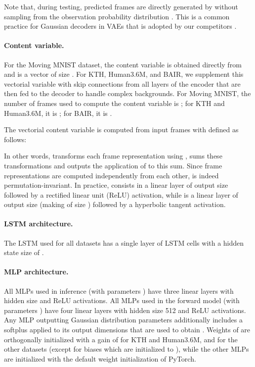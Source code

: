 \documentclass{article}
\begin{document}
Note that, during testing, predicted frames are directly generated by  without sampling from the observation probability distribution .
This is a common practice for Gaussian decoders in VAEs that is adopted by our competitors \citep{Lee2018, Denton2018, Minderer2019}.

\paragraph{Content variable.}
For the Moving MNIST dataset, the content variable  is obtained directly from  and is a vector of size .
For KTH, Human3.6M, and BAIR, we supplement this vectorial variable with skip connections from all layers of the encoder  that are then fed to the decoder  to handle complex backgrounds.
For Moving MNIST, the number of frames  used to compute the content variable is ; for KTH and Human3.6M, it is ; for BAIR, it is .

The vectorial content variable  is computed from  input frames  with  defined as follows:

In other words,  transforms each frame representation using , sums these transformations and outputs the application of  to this sum.
Since frame representations  are computed independently from each other,  is indeed permutation-invariant.
In practice,  consists in a linear layer of output size  followed by a rectified linear unit (ReLU) activation, while  is a linear layer of output size  (making  of size ) followed by a hyperbolic tangent activation.

\paragraph{LSTM architecture.}

The LSTM used for all datasets has a single layer of LSTM cells with a hidden state size of .

\paragraph{MLP architecture.}

All MLPs used in inference (with parameters ) have three linear layers with hidden size  and ReLU activations.
All MLPs used in the forward model (with parameters ) have four linear layers with hidden size 512 and ReLU activations.
Any MLP outputting Gaussian distribution parameters  additionally includes a softplus \citep{Dugas2001} applied to its output dimensions that are used to obtain .
Weights of  are orthogonally initialized with a gain of  for KTH and Human3.6M, and  for the other datasets (except for biases which are initialized to ), while the other MLPs are initialized with the default weight initialization of PyTorch.
\end{document}

